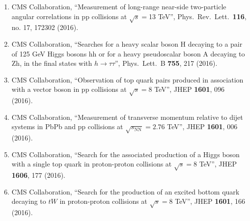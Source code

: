 \begin{enumerate}
\item CMS Collaboration, ``Measurement of long-range near-side two-particle angular correlations in pp collisions at $\sqrt s =$13 TeV'', Phys.\ Rev.\ Lett.\  {\bf 116}, no. 17, 172302 (2016).

\item CMS Collaboration, ``Searches for a heavy scalar boson H decaying to a pair of 125 GeV Higgs bosons hh or for a heavy pseudoscalar boson A decaying to Zh, in the final states with $h \to \tau \tau$'', Phys.\ Lett.\ B {\bf 755}, 217 (2016).

\item CMS Collaboration, ``Observation of top quark pairs produced in association with a vector boson in pp collisions at $ \sqrt{s}=8 $ TeV'', JHEP {\bf 1601}, 096 (2016).

\item CMS Collaboration, ``Measurement of transverse momentum relative to dijet systems in PbPb and pp collisions at $ \sqrt{s_{\mathrm{NN}}}=2.76 $ TeV'', JHEP {\bf 1601}, 006 (2016).

\item CMS Collaboration, ``Search for the associated production of a Higgs boson with a single top quark in proton-proton collisions at $ \sqrt{s}=8 $ TeV'', JHEP {\bf 1606}, 177 (2016).

\item CMS Collaboration, ``Search for the production of an excited bottom quark decaying to $tW$ in proton-proton collisions at $ \sqrt{s}=8 $ TeV'', JHEP {\bf 1601}, 166 (2016).


\end{enumerate}
